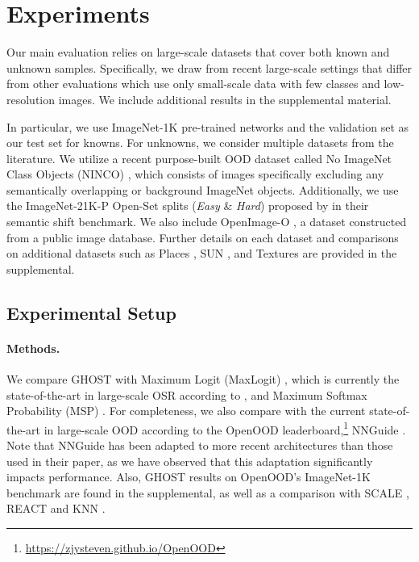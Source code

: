 \section{Experiments}
\label{sec:experiments}
Our main evaluation relies on large-scale datasets that cover both known and unknown samples.
Specifically, we draw from recent large-scale settings \cite{vaze2022openset,hendrycks17baseline,bitterwolf2023or} that differ from other evaluations which use only small-scale data with few classes and low-resolution images.
We include additional results in the supplemental material.

In particular, we use ImageNet-1K \cite{ILSVRC15} pre-trained networks and the validation set as our test set for knowns.
For unknowns, we consider multiple datasets from the literature.
We utilize a recent purpose-built OOD dataset called No ImageNet Class Objects (NINCO) \cite{bitterwolf2023or}, which consists of images specifically excluding any semantically overlapping or background ImageNet objects.
Additionally, we use the ImageNet-21K-P Open-Set splits (\emph{Easy} \& \emph{Hard}) proposed by \citet{vaze2022openset} in their semantic shift benchmark.
We also include OpenImage-O \cite{wang2022vim}, a dataset constructed from a public image database. 
Further details on each dataset and comparisons on additional datasets such as Places \cite{zhou2017places}, SUN \cite{xiao2010sun}, and Textures \cite{Cimpoi_2014_CVPR} are provided in the supplemental.


\subsection{Experimental Setup}
\paragraph{Methods.} We compare GHOST with Maximum Logit (MaxLogit) \cite{hendrycks2022scaling,vaze2022openset}, which is currently the state-of-the-art in large-scale OSR according to \citet{vaze2022openset}, and Maximum Softmax Probability (MSP) \cite{hendrycks17baseline,vaze2022openset}.
For completeness, we also compare with the current state-of-the-art in large-scale OOD according to the OpenOOD \cite{yang2022openood,zhang2023openood} leaderboard,\footnote{\url{https://zjysteven.github.io/OpenOOD}} NNGuide \cite{park2023nearest}.
Note that NNGuide has been adapted to more recent architectures than those used in their paper, as we have observed that this adaptation significantly impacts performance.
Also, GHOST results on OpenOOD's ImageNet-1K benchmark are found in the supplemental, as well as a comparison with SCALE \cite{xu2024scaling}, REACT \cite{sun2021react} and KNN \cite{sun2022out}.

